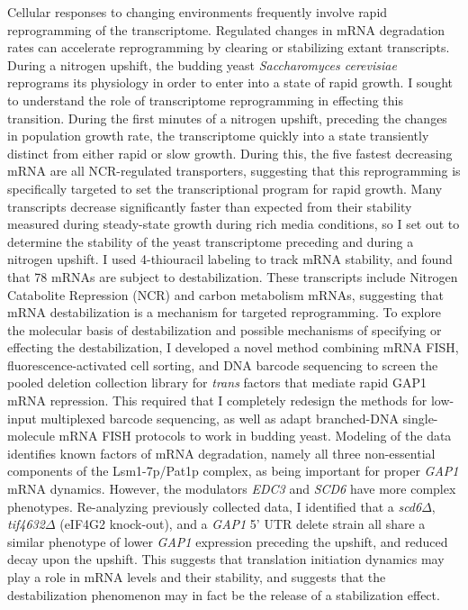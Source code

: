 \documentclass[12pt,letterpaper]{memoir}
\begin{document}
Cellular responses to changing environments frequently involve rapid
reprogramming of the transcriptome. Regulated
changes in mRNA degradation rates can accelerate reprogramming by
clearing or stabilizing extant transcripts. 
During a nitrogen upshift, the budding yeast \textit{Saccharomyces
cerevisiae} reprograms its physiology in order to enter into  
a state of rapid growth. 
I sought to understand the role of transcriptome reprogramming
in effecting this transition.
During the first minutes of a nitrogen upshift,
preceding the changes in population growth rate,
the transcriptome quickly into a state transiently distinct from
either rapid or slow growth.
During this, the five fastest decreasing mRNA are all NCR-regulated 
transporters, suggesting that this reprogramming is specifically
targeted to set the transcriptional program for rapid growth.
Many transcripts decrease significantly faster than expected from
their stability measured during steady-state growth during
rich media conditions, so I set out to determine the stability of
the yeast transcriptome preceding and during a nitrogen upshift.
I used 4-thiouracil labeling to track mRNA stability, and found 
that 78 mRNAs are subject to destabilization. 
These transcripts include
Nitrogen Catabolite Repression (NCR) and carbon metabolism mRNAs,
suggesting that mRNA destabilization is a mechanism for targeted
reprogramming. 
To explore the molecular basis of destabilization and possible
mechanisms of specifying or effecting the destabilization, I
developed a novel method combining mRNA FISH, fluorescence-activated
cell sorting, and DNA barcode sequencing to screen the pooled deletion
collection library for \textit{trans} factors that mediate rapid GAP1 mRNA
repression. This required that I completely redesign the methods for 
low-input multiplexed barcode sequencing, as well as adapt 
branched-DNA single-molecule mRNA FISH protocols to work in budding
yeast. Modeling of the data identifies known factors of mRNA
degradation, namely all three non-essential components of the
Lsm1-7p/Pat1p complex, as being important for proper \textit{GAP1}
mRNA dynamics. However, the modulators \textit{EDC3} and \textit{SCD6}
have more complex phenotypes. Re-analyzing previously collected data,
I identified that a \textit{scd6}$\Delta$, \textit{tif4632}$\Delta$
(eIF4G2 knock-out), and a \textit{GAP1} 5' UTR delete strain all
share a similar phenotype of lower \textit{GAP1} expression preceding
the upshift, and reduced decay upon the upshift. This suggests that 
translation initiation dynamics may play a role in mRNA levels and 
their stability, and suggests that the destabilization phenomenon 
may in fact be the release of a stabilization effect.

\newpage

\tableofcontents*

\mainmatter







\printbibliography[heading=bibintoc,title={References}]
\end{document}
